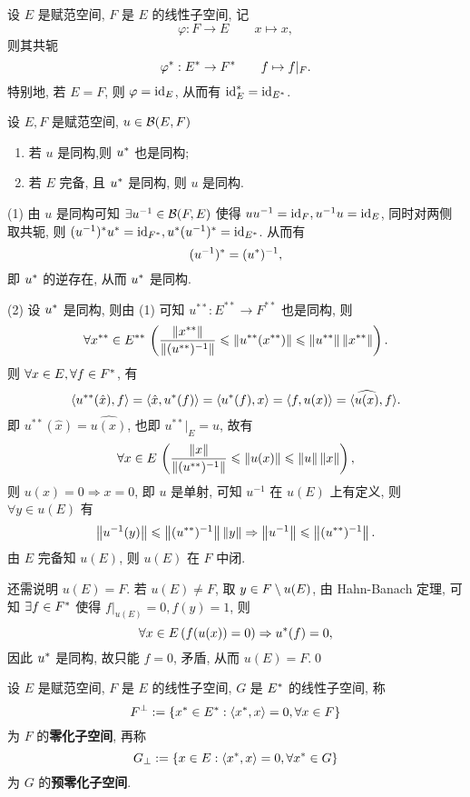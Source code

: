 \begin{Example}
	设 $ E $ 是赋范空间, $ F $ 是 $ E $ 的线性子空间, 记
	\[
		\varphi: F\to E\qquad x\mapsto x,
	\]
	则其共轭
	\[
		\varphi^{*}: E^{*}\to F^{*}\qquad f\mapsto f|_{F}.
	\]
	特别地, 若 $ E=F $, 则 $ \varphi=\mathrm{id}_{E} $, 从而有 $ \mathrm{id}_{E}^{*}=\mathrm{id}_{E^{*}} $.
\end{Example}
\begin{Theorem}
	设 $ E, F $ 是赋范空间, $ u\in\mathcal{B}(E, F) $
	\begin{enumerate}[(1)]
		\item 若 $ u $ 是同构,则 $ u^{*} $ 也是同构;
		\item 若 $ E $ 完备, 且 $ u^{*} $ 是同构, 则 $ u $ 是同构.
	\end{enumerate}
\end{Theorem}
\begin{Proof}
	(1) 由 $ u $ 是同构可知 $ \exists u^{-1}\in\mathcal{B}(F, E) $ 使得 $ uu^{-1}=\mathrm{id}_{F}, u^{-1}u=\mathrm{id}_{E} $, 同时对两侧取共轭, 则 $ (u^{-1})^{*}u^{*}=\mathrm{id}_{F^{*}},u^{*}(u^{-1})^{*}=\mathrm{id}_{E^{*}}  $. 从而有
	\[
		(u^{-1})^{*}=(u^{*})^{-1},
	\]
	即 $ u^{*} $ 的逆存在, 从而 $ u^{*} $ 是同构.

	(2) 设 $ u^{*} $ 是同构, 则由 (1) 可知 $ u^{**}: E^{**}\to F^{**} $ 也是同构, 则
	\[
		\forall x^{**}\in E^{**}\,\left(\frac{\left\| x^{**} \right\|}{\left\| (u^{**})^{-1} \right\|}\leqslant\left\| u^{**}(x^{**}) \right\|\leqslant\left\| u^{**} \right\|\left\| x^{**} \right\|\right).
	\]
	则 $ \forall x\in E, \forall f\in F^{*} $, 有
	\[
		\left\langle u^{**}(\hat{x}), f \right\rangle=\left\langle \hat{x}, u^{*}(f) \right\rangle=\left\langle u^{*}(f), x \right\rangle=\left\langle f, u(x) \right\rangle=\langle\widehat{u(x)}, f\rangle.
	\]
	即 $ u^{**}(\hat{x})=\widehat{u(x)} $, 也即 $ u^{**}|_{E}=u $, 故有
	\[
		\forall x\in E\,\left( \frac{\left\| x \right\|}{\left\| (u^{**})^{-1} \right\|}\leqslant\left\| u(x) \right\|\leqslant\left\| u \right\|\left\| x \right\| \right),
	\]
	则 $ u(x)=0\Longrightarrow x=0 $, 即 $ u $ 是单射, 可知 $ u^{-1} $ 在 $ u(E) $ 上有定义, 则 $ \forall y\in u(E) $ 有
	\[
		\left\| u^{-1}(y) \right\|\leqslant\left\| (u^{**})^{-1} \right\|\left\| y \right\|\Rightarrow \left\| u^{-1} \right\|\leqslant\left\| (u^{**})^{-1} \right\|.
	\]
	由 $ E $ 完备知 $ u(E) $, 则 $ u(E) $ 在 $ F $ 中闭.

	还需说明 $ u(E)=F $. 若 $ u(E)\ne F $, 取 $ y\in F\setminus u(E) $, 由 Hahn-Banach 定理, 可知 $ \exists f\in F^{*} $ 使得 $ f|_{u(E)}=0, f(y)=1 $, 则
	\[
		\forall x\in E\,(f(u(x))=0)\Rightarrow u^{*}(f)=0,
	\]
	因此 $ u^{*} $ 是同构, 故只能 $ f=0 $, 矛盾, 从而 $ u(E)=F $.\qed
\end{Proof}

\begin{Definition}\label{def:零化子空间}
	设 $ E $ 是赋范空间, $ F $ 是 $ E $ 的线性子空间, $ G $ 是 $ E^{*} $ 的线性子空间, 称
	\[
		F^{\bot}:=\{ x^{*}\in E^{*}:\left\langle x^{*}, x \right\rangle=0, \forall x\in F \}
	\]
	为 $ F $ 的\textbf{零化子空间}, 再称
	\[
		G_{\bot}:=\{ x\in E:\left\langle x^{*}, x \right\rangle=0, \forall x^{*}\in G \}
	\]
	为 $ G $ 的\textbf{预零化子空间}.
\end{Definition}

